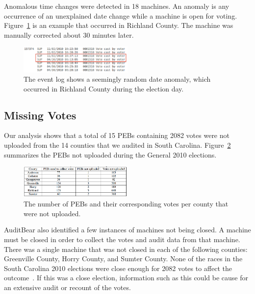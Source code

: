\documentclass[letterpaper,twocolumn,10pt]{article}
\begin{document}
Anomalous time changes were detected in 18 machines. An anomaly is any
occurrence of an unexplained date change while a machine is open for
voting. Figure~\ref{fig:date-anomaly} is an example that occurred in Richland
County. The machine was manually corrected about 30 minutes later.  

\begin{figure}[htbp]
\begin{center}
    \includegraphics[width=0.5\textwidth,height=0.1\textheight]{DateAnomaly.eps}
\end{center}
\caption{The event log shows a seemingly random date anomaly, which occurred in Richland County during the election day.}
\label{fig:date-anomaly}
\end{figure}

\subsection{Missing Votes}
Our analysis shows that a total of 15 PEBs containing 2082 votes were not
uploaded from the 14 counties that we audited in South
Carolina. Figure~\ref{fig:pebs-not-uploaded} summarizes the PEBs not uploaded
during the General 2010 elections.  

\begin{figure}[htbp]
\begin{center}
    \includegraphics[width=0.5\textwidth,height=0.1\textheight]{PEBsNotUploaded1.eps}
\end{center}
\caption{The number of PEBs and their corresponding votes per county that were not uploaded.}
\label{fig:pebs-not-uploaded}
\end{figure}

AuditBear also identified a few instances of machines not being closed. A
machine must be closed in order to collect the votes and audit data from that
machine. There was a single machine that was not closed in each of the following
counties: Greenville County, Horry County, and Sumter County. None of the races in 
the South Carolina 2010 elections were close enough for 2082 votes to affect the 
outcome~\cite{scresults}. If this 
was a close election, information such as this could be cause for an extensive audit 
or recount of the votes.  
\end{document}
